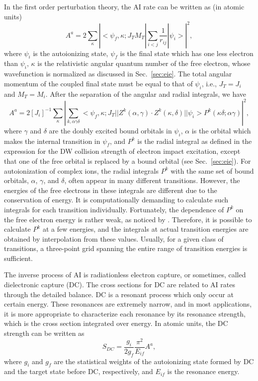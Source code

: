In the first order perturbation theory, the AI rate can be written as (in
atomic units) 
\begin{equation}
A^a = 2\sum_\kappa \left|
<\psi_f,\kappa;J_TM_T|\sum_{i<j}\frac{1}{r_{ij}}|\psi_i>\right|^2,
\end{equation}
where $\psi_i$ is the autoionizing state, $\psi_f$ is the final state which has
one less electron than $\psi_i$, $\kappa$ is the relativistic angular quantum
number of the free electron, whose wavefunction is normalized as discussed in
Sec.~\ref{sec:eie}. The total angular momentum of the coupled final state must
be equal to that of $\psi_i$, i.e.,  $J_T = J_i$ and $M_T = M_i$. After the
separation of the angular and radial integrals, we have
\begin{equation}
A^a = 2[J_i]^{-1}\sum_\kappa \left|\sum_{k,\alpha\gamma\delta}
<\psi_f,\kappa;J_T||Z^k(\alpha,\gamma)
\cdot Z^k(\kappa,\delta)||\psi_i>P^k(\kappa\delta;\alpha\gamma)\right|^2,
\end{equation}
where $\gamma$ and $\delta$ are the doubly excited bound orbitals in
$\psi_i$, $\alpha$ is the orbital which makes the internal transition in
$\psi_f$, and
$P^k$ is the radial integral as defined in the expression for the DW collision
strength of electron impact excitation, except that one of the free orbital
is replaced by a bound orbital (see Sec.~\ref{sec:eie}). For autoionization of
complex ions, the radial integrals $P^k$ with the same set of bound orbitals,
$\alpha$, $\gamma$, and $\delta$, 
often appear in many different transitions. However, the energies of the free
electrons in these integrals are different due to the conservation of
energy. It is 
computationally demanding to calculate such integrals for each transition
individually. Fortunately, the dependence of $P^k$ on the free electron energy
is rather weak, as noticed by \citet{oreg:1991a}. Therefore, it is possible to
calculate $P^k$ at a few energies, and the integrals at actual transition
energies are obtained by interpolation from these values. Usually, for a given
class of 
transitions, a three-point grid spanning the entire range of transition
energies is sufficient.

The inverse process of AI is radiationless electron capture, or sometimes,
called dielectronic capture (DC). The cross sections for DC are related to AI
rates through the detailed balance. DC is a resonant process which only occur
at certain energy. These resonances are extremely narrow, and in most
applications, it is more appropriate to characterize each resonance by its
resonance strength, which is the cross section integrated over energy. In
atomic units, the DC strength can be written as
\begin{equation}
S_{DC} = \frac{g_i}{2g_f}\frac{\pi^2}{E_{if}}A^a,
\end{equation}
where $g_i$ and $g_f$ are the statistical weights of the autoionizing state
formed by DC and the target state before DC, respectively, and $E_{if}$ is the
resonance energy. 

